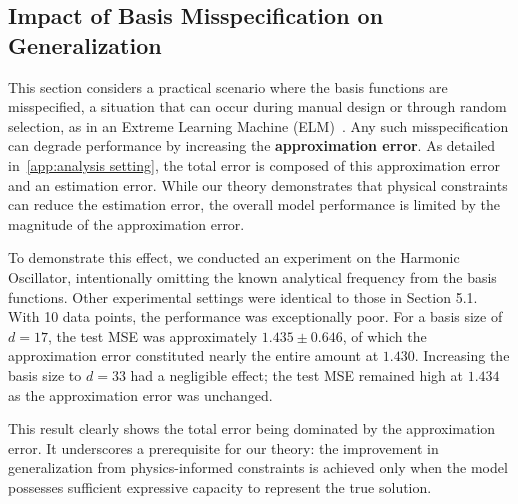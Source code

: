 \documentclass{article}
\theoremstyle{plain}
\theoremstyle{definition}
\theoremstyle{remark}
\begin{document}
\subsection{Impact of Basis Misspecification on Generalization}

This section considers a practical scenario where the basis functions are misspecified, a situation that can occur during manual design or through random selection, as in an Extreme Learning Machine (ELM)~\citep{huang2006extreme}. Any such misspecification can degrade performance by increasing the \textbf{approximation error}. As detailed in~\cref{app:analysis setting}, the total error is composed of this approximation error and an estimation error. While our theory demonstrates that physical constraints can reduce the estimation error, the overall model performance is limited by the magnitude of the approximation error. 

To demonstrate this effect, we conducted an experiment on the Harmonic Oscillator, intentionally omitting the known analytical frequency from the basis functions. Other experimental settings were identical to those in Section 5.1. With 10 data points, the performance was exceptionally poor. For a basis size of $d=17$, the test MSE was approximately $1.435 \pm 0.646$, of which the approximation error constituted nearly the entire amount at $1.430$. Increasing the basis size to $d=33$ had a negligible effect; the test MSE remained high at $1.434$ as the approximation error was unchanged.

This result clearly shows the total error being dominated by the approximation error. It underscores a prerequisite for our theory: the improvement in generalization from physics-informed constraints is achieved only when the model possesses sufficient expressive capacity to represent the true solution. 
\end{document}

